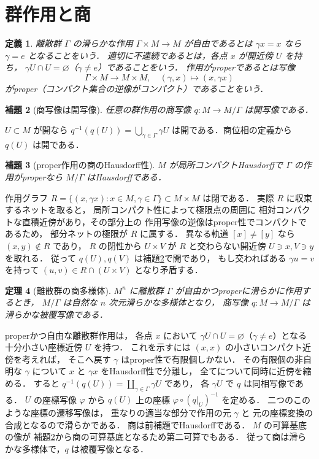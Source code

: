 \documentclass[a5paper,10pt,onecolumn]{jsarticle}
\makeatletter
\theoremstyle{mathnotetheorem}
\newtheorem{theorem}{定理}[section]
\newtheorem{definition}[theorem]{定義}
\newtheorem{lemma}[theorem]{補題}
\renewcommand{\proofname}{証明}
\renewenvironment{proof}[1][\proofname]{%
  \par\pushQED{\qed}\normalfont\topsep4\p@\@plus2\p@\relax
  \trivlist\item[\hskip\labelsep\bfseries #1]\ignorespaces
}{\popQED\endtrivlist\@endpefalse}
\makeatother
\begin{document}
\section{群作用と商}
\begin{definition}
離散群 $\Gamma$ の滑らかな作用
$\Gamma\times M\to M$ が自由であるとは
$\gamma x=x$ なら $\gamma=e$ となることをいう．
適切に不連続であるとは，各点 $x$ が開近傍 $U$ を持ち，
$\gamma U\cap U=\varnothing$（$\gamma\ne e$）であることをいう．
作用がproperであるとは写像
\[
 \Gamma\times M\longrightarrow M\times M,\quad
 (\gamma,x)\longmapsto(x,\gamma x)
\]
がproper（コンパクト集合の逆像がコンパクト）であることをいう．
\end{definition}
\begin{lemma}[商写像は開写像]\label{lem:open}
任意の群作用の商写像 $q:M\to M/\Gamma$ は開写像である．
\end{lemma}
\begin{proof}
$U\subset M$ が開なら
$q^{-1}(q(U))=\bigcup_{\gamma\in\Gamma}\gamma U$
は開である．商位相の定義から $q(U)$ は開である．
\end{proof}
\begin{lemma}[proper作用の商のHausdorff性]
$M$ が局所コンパクトHausdorffで $\Gamma$ の作用がproperなら
$M/\Gamma$ はHausdorffである．
\end{lemma}
\begin{proof}
作用グラフ
$R=\{(x,\gamma x):x\in M,\gamma\in\Gamma\}\subset M\times M$
は閉である．
実際 $R$ に収束するネットを取ると，
局所コンパクト性によって極限点の周囲に
相対コンパクトな直積近傍があり，その部分上の
作用写像の逆像はproper性でコンパクトであるため，
部分ネットの極限が $R$ に属する．
異なる軌道 $[x]\ne[y]$ なら
$(x,y)\notin R$ であり，
$R$ の閉性から
$U\times V$ が $R$ と交わらない開近傍
$U\ni x,V\ni y$ を取れる．
従って $q(U),q(V)$ は補題\ref{lem:open}で開であり，
もし交わればある $\gamma u=v$ を持って
$(u,v)\in R\cap(U\times V)$ となり矛盾する．
\end{proof}
\begin{theorem}[離散群の商多様体]\label{thm:quotientmanifold}
$M^n$ に離散群 $\Gamma$ が自由かつproperに滑らかに作用するとき，
$M/\Gamma$ は自然な $n$ 次元滑らかな多様体となり，
商写像 $q:M\to M/\Gamma$ は滑らかな被覆写像である．
\end{theorem}
\begin{proof}
properかつ自由な離散群作用は，
各点 $x$ において
$\gamma U\cap U=\varnothing$（$\gamma\ne e$）となる
十分小さい座標近傍 $U$ を持つ．
これを示すには
$(x,x)$ の小さいコンパクト近傍を考えれば，
そこへ戻す $\gamma$ はproper性で有限個しかない．
その有限個の非自明な $\gamma$ について
$x$ と $\gamma x$ をHausdorff性で分離し，
全てについて同時に近傍を縮める．
すると $q^{-1}(q(U))=\coprod_{\gamma\in\Gamma}\gamma U$ であり，
各 $\gamma U$ で $q$ は同相写像である．
$U$ の座標写像 $\varphi$ から
$q(U)$ 上の座標
$\varphi\circ(q|_U)^{-1}$ を定める．
二つのこのような座標の遷移写像は，
重なりの適当な部分で作用の元 $\gamma$ と
元の座標変換の合成となるので滑らかである．
商は前補題でHausdorffである．
$M$ の可算基底の像が
補題\ref{lem:open}から商の可算基底となるため第二可算でもある．
従って商は滑らかな多様体で，$q$ は被覆写像となる．
\end{proof}
\end{document}
